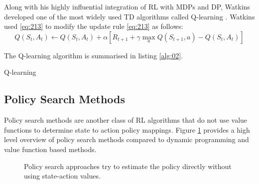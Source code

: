 Along with his highly influential integration of RL with MDPs and DP, Watkins developed one of the most widely used TD algorithms called Q-learning \cite{Watkins1989}. Watkins used \ref{eq:213} to modify the update rule \ref{eq:213} as follows:
\begin{equation}
	Q(S_t, A_t) \gets Q(S_t, A_t) + \alpha[R_{t+1} + \gamma \max_{a} Q(S_{t+1},a) - Q(S_t, A_t)] \label{eq:214}
\end{equation}

The Q-learning algorithm is summarised in listing \ref{alg:02}.

\begin{algorithm}[h]
	\caption{Q-learning}
	\label{alg:02_q_learning}
	\begin{algorithmic}[1]
			\Repeat
		\EndFor
	\end{algorithmic} \label{alg:02}
\end{algorithm}


\subsection{Policy Search Methods}
Policy search methods are another class of RL algorithms that do not use value functions to determine state to action policy mappings. Figure \ref{fig:2xx_families_of_RL_algorithms} provides a high level overview of policy search methods compared to dynamic programming and value function based methods.

\begin{figure}[h]
	\centering
	\resizebox{\textwidth}{!}{}
	\caption[RL approaches: Policy search]{Policy search approaches try to estimate the policy directly without using state-action values.}
	\label{fig:2xx_families_of_RL_algorithms}
\end{figure}

